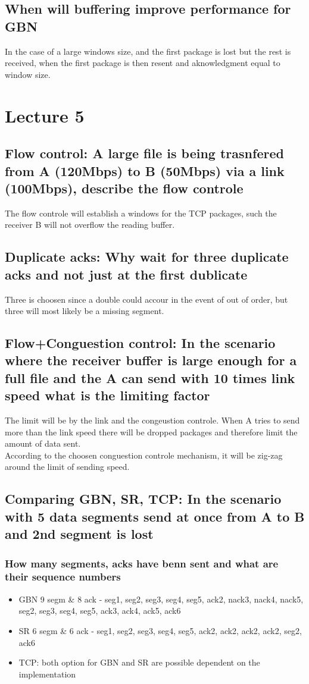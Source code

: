 \documentclass[12pt, a4paper]{article}
\begin{document}
		\subsection{When will buffering improve performance for GBN}
			In the case of a large windows size, and the first package is lost but the rest is received, when the first package is then resent and aknowledgment equal to window size.
	\section{Lecture 5}
		\subsection{Flow control: A large file is being trasnfered from A (120Mbps) to B (50Mbps) via a link (100Mbps), describe the flow controle}
			The flow controle will establish a windows for the TCP packages, such the receiver B will not overflow the reading buffer.
		\subsection{Duplicate acks: Why wait for three duplicate acks and not just at the first dublicate}
			Three is choosen since a double could accour in the event of out of order, but three will most likely be a missing segment.
		\subsection{Flow+Conguestion control: In the scenario where the receiver buffer is large enough for a full file and the A can send with 10 times link speed what is the limiting factor}
			The limit will be by the link and the congeustion controle. When A tries to send more than the link speed there will be dropped packages and therefore limit the amount of data sent.\\
			According to the choosen conguestion controle mechanism, it will be zig-zag around the limit of sending speed.
		\subsection{Comparing GBN, SR, TCP: In the scenario with 5 data segments send at once from A to B and 2nd segment is lost}
			\subsubsection{How many segments, acks have benn sent and what are their sequence numbers}
				\begin{itemize}
					\item GBN 9 segm \& 8 ack - seg1, seg2, seg3, seg4, seg5, ack2, nack3, nack4, nack5, seg2, seg3, seg4, seg5, ack3, ack4, ack5, ack6
					\item SR 6 segm \& 6 ack - seg1, seg2, seg3, seg4, seg5, ack2, ack2, ack2, ack2, seg2, ack6
					\item TCP: both option for GBN and SR are possible dependent on the implementation
				\end{itemize}
\end{document}

